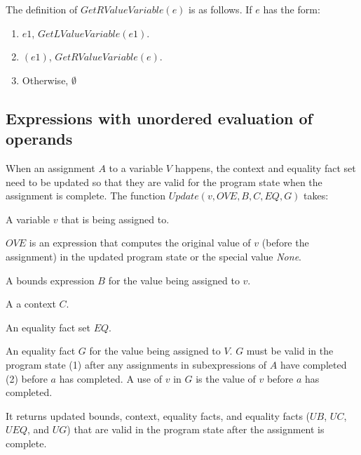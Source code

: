 The definition of $GetRValueVariable(e)$ is as follows. If $e$ has the form:
\begin{enumerate}
\item \code{&}$e1$, $GetLValueVariable(e1)$.
\item$(e1)$, $GetRValueVariable(e)$.
\item Otherwise, $\emptyset$
\end{enumerate}

\subsection{Expressions with unordered evaluation of operands}

When an assignment $A$ to a variable $V$ happens, the context and equality fact set 
need to be updated so that they are valid for the program state when the assignment is complete.
The function $Update(v, OVE, B, C, EQ, G)$ takes:
\begin{compactitem}
\item A variable $v$ that is being assigned to.
\item $OVE$ is an expression that computes the original value of $v$ 
(before the assignment) in the updated program state or the special value {\it None}.
\item A bounds expression $B$ for the value being assigned to $v$.
\item A a context $C$.
\item An equality fact set $EQ$. 
\item An equality fact $G$ for the value being assigned to $V$.  $G$ must be valid in the program
state (1) after any assignments in subexpressions of $A$ have completed (2) before $a$
has completed.   A use of $v$ in $G$ is the value of $v$ before $a$ has completed.
\end{compactitem}
It returns updated bounds, context, equality facts, and equality facts ($UB$, $UC$, $UEQ$, and $UG$)
that are valid in the program state after the assignment is complete.

